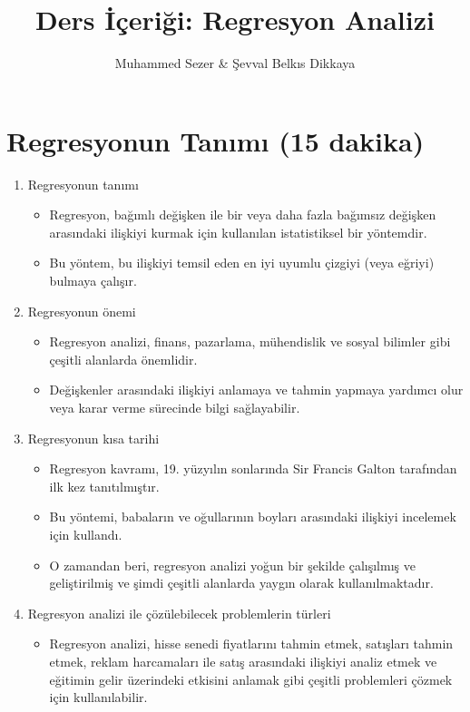 \documentclass{article}
\begin{document}
\title{Ders İçeriği: Regresyon Analizi}
\author{Muhammed Sezer & Şevval Belkıs Dikkaya}
\date{}

\maketitle

\section{Regresyonun Tanımı (15 dakika)}
\begin{enumerate}[label=\alph*)]
\item Regresyonun tanımı
\begin{itemize}
\item Regresyon, bağımlı değişken ile bir veya daha fazla bağımsız değişken arasındaki ilişkiyi kurmak için kullanılan istatistiksel bir yöntemdir.
\item Bu yöntem, bu ilişkiyi temsil eden en iyi uyumlu çizgiyi (veya eğriyi) bulmaya çalışır.
\end{itemize}

\item Regresyonun önemi
\begin{itemize}
\item Regresyon analizi, finans, pazarlama, mühendislik ve sosyal bilimler gibi çeşitli alanlarda önemlidir.
\item Değişkenler arasındaki ilişkiyi anlamaya ve tahmin yapmaya yardımcı olur veya karar verme sürecinde bilgi sağlayabilir.
\end{itemize}

\item Regresyonun kısa tarihi
\begin{itemize}
\item Regresyon kavramı, 19. yüzyılın sonlarında Sir Francis Galton tarafından ilk kez tanıtılmıştır.
\item Bu yöntemi, babaların ve oğullarının boyları arasındaki ilişkiyi incelemek için kullandı.
\item O zamandan beri, regresyon analizi yoğun bir şekilde çalışılmış ve geliştirilmiş ve şimdi çeşitli alanlarda yaygın olarak kullanılmaktadır.
\end{itemize}

\item Regresyon analizi ile çözülebilecek problemlerin türleri
\begin{itemize}
\item Regresyon analizi, hisse senedi fiyatlarını tahmin etmek, satışları tahmin etmek, reklam harcamaları ile satış arasındaki ilişkiyi analiz etmek ve eğitimin gelir üzerindeki etkisini anlamak gibi çeşitli problemleri çözmek için kullanılabilir.
\end{itemize}


\end{enumerate}
\end{document}
